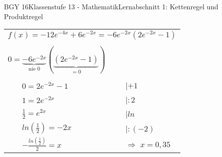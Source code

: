 \documentclass[oneside,openany,headings=optiontotoc,11pt,numbers=noenddot]{scrreprt}
\begin{document}
\begin{worksheet}{BGY 16}{Klassenstufe 13 - Mathematik}{Lernabschnitt 1: Kettenregel und Produktregel}
\begin{framed}
\begin{tabularx}{\textwidth}{lll}
			\multicolumn{3}{l}{\(f(x) = -12e^{-4x}+6e^{-2x} = -6e^{-2x}(2e^{-2x}-1)\)}\\
			\\
			\multicolumn{2}{l}{\(0 = \underbrace{-6e^{-2x}}_{\text{nie 0}}(\underbrace{(2e^{-2x}-1)}_{=0})\)}\\
			\\
			& \(0 = 2e^{-2x}-1\) & |\(+1\)\\
			& \(1 = 2e^{-2x}\) & |\(:2\)\\
			& \(\frac{1}{2} = e^{2x}\) & |\(ln\)\\
			& \(ln(\frac{1}{2}) = -2x\) & |\(:(-2)\)\\
			& \(-\frac{ln(\frac{1}{2})}{2} = x\) & \(\Rightarrow\) \colorbox{green!10}{\(x = 0,35\)}
		\end{tabularx}
	\end{framed}
	\end{worksheet}
\end{document}
